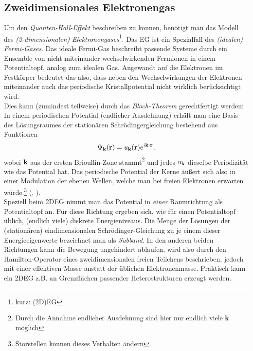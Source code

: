 \subsection{Zweidimensionales Elektronengas}
Um den \emph{Quanten-Hall-Effekt} beschreiben zu können, benötigt man das Modell des \emph{(2-dimensionalen) Elektronengases}\footnote{kurz: (2D)EG}.
Das EG ist ein Spezialfall des \emph{(idealen) Fermi-Gases}. Das ideale Fermi-Gas beschreibt passende Systeme durch ein Ensemble von nicht miteinander wechselwirkenden Fermionen in einem Potentialtopf, analog zum idealen Gas.
Angewandt auf die Elektronen im Festkörper bedeutet das also, dass neben den Wechselwirkungen der Elektronen miteinander auch das periodische Kristallpotential nicht wirklich berücksichtigt wird.\\

Dies kann (zumindest teilweise) durch das \emph{Bloch-Theorem} gerechtfertigt werden:\\
In einem periodischen Potential (endlicher Ausdehnung) erhält man eine Basis des Lösungsraumes der stationären Schrödingergleichung bestehend aus Funktionen
$$\Psi_{\textbf{k}}(\textbf{r}) = u_{\textbf{k}}(\textbf{r}) e^{i\textbf{k}\cdot\textbf{r}},$$
wobei $\textbf{k}$ aus der ersten Brioullin-Zone stammt\footnote{Durch die Annahme endlicher Ausdehnung sind hier nur endlich viele $\textbf{k}$ möglich} und jedes $u_{\textbf{k}}$ dieselbe Periodizität wie das Potential hat.
Das periodische Potential der Kerne äußert sich also in einer Modulation der ebenen Wellen, welche man bei freien Elektronen erwarten würde.\footnote{Störstellen können dieses Verhalten ändern} (\cite{czy15}, \cite{gro18}).\\

Speziell beim 2DEG nimmt man das Potential in \emph{einer} Raumrichtung als Potentialtopf an. Für diese Richtung ergeben sich, wie für einen Potentialtopf üblich, (endlich viele) diskrete Energieniveaus. Die Menge der Lösungen der (stationären) eindimensionalen Schrödinger-Gleichung zu je einem dieser Energieeigenwerte bezeichnet man als \emph{Subband}.
In den anderen beiden Richtungen kann die Bewegung ungehindert ablaufen, wird also durch den Hamilton-Operator eines zweidimensionalen freien Teilchens beschrieben, jedoch mit einer effektiven Masse anstatt der üblichen Elektronenmasse.
Praktisch kann ein 2DEG z.B. an Grenzflächen passender Heterostrukturen erzeugt werden.

